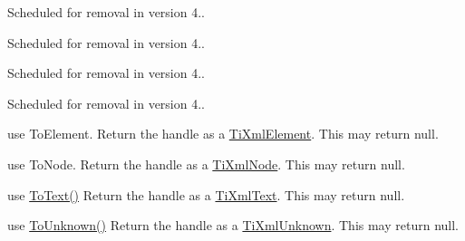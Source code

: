 
\begin{DoxyRefList}
\item[Member \mbox{\hyperlink{group__input_gac3cf64f90b6219c05ac7b7822d5a4b8f}{GLFWcharmodsfun}} )(GLFWwindow $\ast$window, unsigned int codepoint, int mods)]\label{deprecated__deprecated000007}%
%
Scheduled for removal in version 4..

\label{deprecated__deprecated000009}%
%
Scheduled for removal in version 4.. 
\item[Member \mbox{\hyperlink{group__input_ga359a8529c2eb06e6e2173168f30ac99c}{glfw\+Set\+Char\+Mods\+Callback}} (GLFWwindow $\ast$window, GLFWcharmodsfun callback)]\label{deprecated__deprecated000008}%
%
Scheduled for removal in version 4..

\label{deprecated__deprecated000010}%
%
Scheduled for removal in version 4.. 
\item[File \mbox{\hyperlink{_s_d_l__types_8h}{SDL\+\_\+types.h}} ]\label{deprecated__deprecated000005}%
%
  
\item[Member \mbox{\hyperlink{class_ti_xml_handle_ac56814c76757eecc5bd951d3ed710dd2}{Ti\+Xml\+Handle\+::Element}} () const]\label{deprecated__deprecated000002}%
%
use To\+Element. Return the handle as a \mbox{\hyperlink{class_ti_xml_element}{Ti\+Xml\+Element}}. This may return null.  
\item[Member \mbox{\hyperlink{class_ti_xml_handle_afa2eb82bacfb6e4c3dd5351ce28e5d7a}{Ti\+Xml\+Handle\+::Node}} () const]\label{deprecated__deprecated000001}%
%
use To\+Node. Return the handle as a \mbox{\hyperlink{class_ti_xml_node}{Ti\+Xml\+Node}}. This may return null.  
\item[Member \mbox{\hyperlink{class_ti_xml_handle_a58a9b3e3d710a603038e6e291eb6d580}{Ti\+Xml\+Handle\+::Text}} () const]\label{deprecated__deprecated000003}%
%
use \mbox{\hyperlink{class_ti_xml_handle_a8ddc9f6fe3fbcd86294c6a83d2e281db}{To\+Text()}} Return the handle as a \mbox{\hyperlink{class_ti_xml_text}{Ti\+Xml\+Text}}. This may return null.  
\item[Member \mbox{\hyperlink{class_ti_xml_handle_aa7a8756af3ac24f0b2d469e500b85824}{Ti\+Xml\+Handle\+::Unknown}} () const]\label{deprecated__deprecated000004}%
%
use \mbox{\hyperlink{class_ti_xml_handle_a112bd6325e4bcdf0717c0ea013eac105}{To\+Unknown()}} Return the handle as a \mbox{\hyperlink{class_ti_xml_unknown}{Ti\+Xml\+Unknown}}. This may return null. 
\end{DoxyRefList}